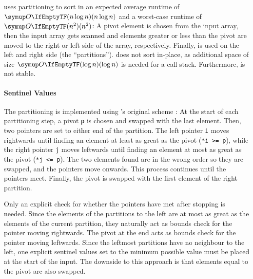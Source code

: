 \section{\texorpdfstring{\QS{}}{QuickSort}}
\label{sec:tasklet:quick}

\QS{} \cite{hoare1962quicksort} uses partitioning to sort in an expected average runtime of \(\bigoh{n \log n}\) and a worst-case runtime of \(\bigoh{n^2}\):
A pivot element is chosen from the input array, then the input array gets scanned and elements greater or less than the pivot are moved to the right or left side of the array, respectively.
Finally, \QS{} is used on the left and right side (the \enquote{partitions}).
\QS{} does not sort in-place, as additional space of size \(\bigoh{\log n}\) is needed for a call stack.
Furthermore, \QS{} is not stable.


\paragraph{Sentinel Values}
The partitioning is implemented using \citeauthor{hoare1962quicksort}'s original scheme \cite{hoare1962quicksort}:
At the start of each partitioning step, a pivot \lstinline|p| is chosen and swapped with the last element.
Then, two pointers are set to either end of the partition.
The left pointer \lstinline|i| moves rightwards until finding an element at least as great as the pivot (\lstinline|*i >= p|), while the right pointer \lstinline|j| moves leftwards until finding an element at most as great as the pivot (\lstinline|*j <= p|).
The two elements found are in the wrong order so they are swapped, and the pointers move onwards.
This process continues until the pointers meet.
Finally, the pivot is swapped with the first element of the right partition.

Only an explicit check for whether the pointers have met after stopping is needed.
Since the elements of the partitions to the left are at most as great as the elements of the current partition, they naturally act as bounds check for the pointer moving rightwards.
The pivot at the end acts as bounds check for the pointer moving leftwards.
Since the leftmost partitions have no neighbour to the left, one explicit sentinel values set to the minimum possible value must be placed at the start of the input.
The downside to this approach is that elements equal to the pivot are also swapped.

